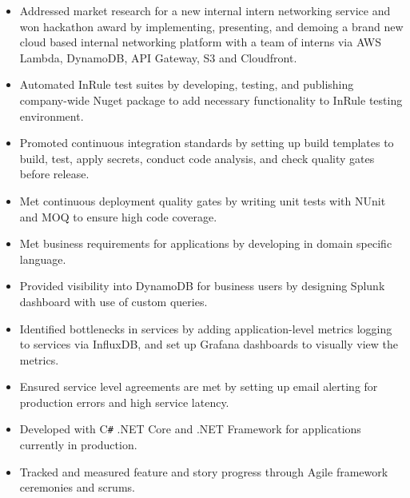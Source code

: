 \documentclass[overlapped]{res}
\begin{document}
\begin{resume}
\begin{itemize}
                  \item Addressed market research for a new internal intern networking service
                  and won hackathon award
                  by implementing, presenting, and demoing 
                  a brand new cloud based internal
                   networking platform with a team of interns
                   via
                   AWS Lambda, DynamoDB, API Gateway, S3 and Cloudfront.

                  \item Automated InRule test suites by developing, testing, and publishing
                  company-wide Nuget package to add
                  necessary functionality to InRule testing environment.

                  \item Promoted continuous integration standards by setting up build templates to build,
                  test, apply secrets, conduct code analysis,
                  and check quality gates before release.

                  \item Met continuous deployment quality gates by writing unit tests
                  with NUnit and MOQ to ensure high code coverage.

                  \item Met business requirements for applications by developing in domain
                  specific language.

                  \item Provided visibility into DynamoDB for business users
                  by designing Splunk dashboard with use of
                  custom queries.

                  \item Identified bottlenecks in services by adding application-level
                  metrics logging to services via InfluxDB,
                  and set up Grafana dashboards to visually view the metrics.

                  \item Ensured service level agreements are met by setting up email alerting 
                  for production errors and high service latency.

                  \item Developed with C\texttt{\#} .NET Core and .NET Framework
                  for applications currently in production.

                  \item Tracked and measured feature and story progress through
                  Agile framework ceremonies and scrums.


\end{itemize}
\end{resume}
\end{document}
